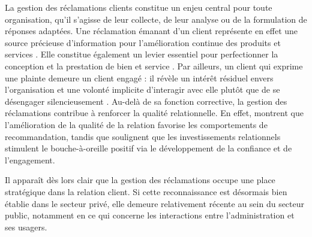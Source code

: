 \documentclass[a4paper,12pt, openany]{book}
\begin{document}
La gestion des réclamations clients constitue un enjeu central pour toute organisation, qu’il s’agisse de leur collecte, de leur analyse ou de la formulation de réponses adaptées. Une réclamation émanant d’un client représente en effet une source précieuse d’information pour l’amélioration continue des produits et services \parencite{harari92}. Elle constitue également un levier essentiel pour perfectionner la conception et la prestation de bien et service \parencite{tax1998}. Par ailleurs, un client qui exprime une plainte demeure un client engagé : il révèle un intérêt résiduel envers l’organisation et une volonté implicite d’interagir avec elle plutôt que de se désengager silencieusement \parencite{harari92, richard95}. Au-delà de sa fonction corrective, la gestion des réclamations contribue à renforcer la qualité relationnelle. En effet, \textcite{brown05} montrent que l’amélioration de la qualité de la relation favorise les comportements de recommandation, tandis que \textcite{palmatier06} soulignent que les investissements relationnels stimulent le bouche-à-oreille positif via le développement de la confiance et de l’engagement. \par


Il apparaît dès lors clair que la gestion des réclamations occupe une place stratégique dans la relation client. Si cette reconnaissance est désormais bien établie dans le secteur privé, elle demeure relativement récente au sein du secteur public, notamment en ce qui concerne les interactions entre l'administration et ses usagers. \par




\end{document}
